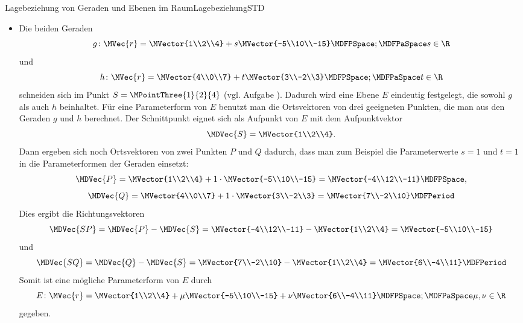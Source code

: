 \begin{MXContent}{Lagebeziehung von Geraden und Ebenen im Raum}{Lagebeziehung}{STD}
\begin{MExample}
\begin{itemize}
\item Die beiden Geraden 
\[
 g\colon\MVec{r}=\MVector{1\\2\\4}+s\MVector{-5\\10\\-15}\MDFPSpace;\MDFPaSpace s\in\R
\]
und
\[
 h\colon\MVec{r}=\MVector{4\\0\\7}+t\MVector{3\\-2\\3}\MDFPSpace;\MDFPaSpace t\in\R
\]
schneiden sich im Punkt $S=\MPointThree{1}{2}{4}$ (vgl. Aufgabe ). Dadurch wird eine Ebene $E$ eindeutig festgelegt, die sowohl $g$ als auch $h$ beinhaltet. Für eine Parameterform von $E$ benutzt man die Ortsvektoren von drei geeigneten Punkten, die man aus den Geraden $g$ und $h$ berechnet. Der Schnittpunkt eignet sich als Aufpunkt von $E$ mit dem Aufpunktvektor
\[
 \MDVec{S}=\MVector{1\\2\\4}.
\]
Dann ergeben sich noch Ortsvektoren von zwei Punkten $P$ und $Q$ dadurch, dass man zum Beispiel die Parameterwerte $s=1$ und $t=1$ in die Parameterformen der Geraden einsetzt:
\[
 \MDVec{P}=\MVector{1\\2\\4}+1\cdot\MVector{-5\\10\\-15}=\MVector{-4\\12\\-11} \MDFPSpace,
\]
\[
 \MDVec{Q}=\MVector{4\\0\\7}+1\cdot\MVector{3\\-2\\3}=\MVector{7\\-2\\10} \MDFPeriod
\]
Dies ergibt die Richtungsvektoren
\[
 \MDVec{S P}=\MDVec{P}-\MDVec{S}= \MVector{-4\\12\\-11}-\MVector{1\\2\\4}=\MVector{-5\\10\\-15}
\]
und
\[
 \MDVec{S Q}=\MDVec{Q}-\MDVec{S}= \MVector{7\\-2\\10}-\MVector{1\\2\\4}=\MVector{6\\-4\\11} \MDFPeriod
\]
Somit ist eine mögliche Parameterform von $E$ durch
\[
 E\colon \MVec{r}=\MVector{1\\2\\4}+\mu\MVector{-5\\10\\-15}+\nu\MVector{6\\-4\\11}\MDFPSpace;\MDFPaSpace \mu,\nu\in\R
\]
gegeben.


\end{itemize}
\end{MExample}
\end{MXContent}
